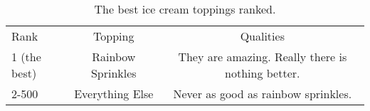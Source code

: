 \begin{table}[bth] %
\small             %
\caption{The best ice cream toppings ranked.}
\begin{tabular}{|lcc|} \firsthline  %
 Rank & Topping & Qualities \\ \cline{1-3}
 1 (the best) & Rainbow Sprinkles & They are amazing. Really there is nothing better. \\
 2-500 & Everything Else & Never as good as rainbow sprinkles. \\ \hline
\end{tabular}
\end{table}

